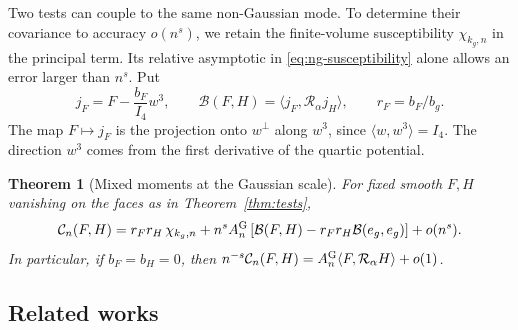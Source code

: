 \documentclass[11pt]{article}
\numberwithin{equation}{section}
\newtheorem{theorem}{Theorem}[section]
\newcommand{\ip}[2]{\langle #1,#2\rangle}
\newcommand{\Ga}{\mathcal R_\alpha}
\newcommand{\Cspin}{\mathcal C_n}
\begin{document}


Two tests can couple to the same non-Gaussian mode. To determine their covariance
to accuracy $o(n^s)$, we retain the finite-volume susceptibility
$\chi_{k_g,n}$ in the principal term. Its relative asymptotic in
\eqref{eq:ng-susceptibility} alone allows an error larger than $n^s$. Put
\begin{equation}
 j_F=F-\frac{b_F}{I_4}w^3,\qquad
 \mathcal B(F,H)=\ip{j_F}{\Ga j_H},\qquad r_F=b_F/b_g.
\end{equation}
The map $F\mapsto j_F$ is the projection onto $w^\perp$ along $w^3$,
since $\ip{w}{w^3}=I_4$. The direction $w^3$ comes from the first
derivative of the quartic potential.
\begin{theorem}[Mixed moments at the Gaussian scale]\label{thm:mixed}
For fixed smooth $F,H$ vanishing on the faces as in Theorem~\ref{thm:tests},
\begin{equation}
 \Cspin(F,H)=r_F r_H\,\chi_{k_g,n}
 + n^s A_n^{\rm G}
    \left[\mathcal B(F,H)-r_F r_H \mathcal B(e_g,e_g)\right]+o(n^s).
 \label{eq:mixed}
\end{equation}
In particular, if $b_F=b_H=0$, then
$n^{-s}\Cspin(F,H)=A_n^{\rm G}\ip{F}{\Ga H}+o(1)$.
\end{theorem}

\subsection{Related works}
\label{sec:literature}
\end{document}
